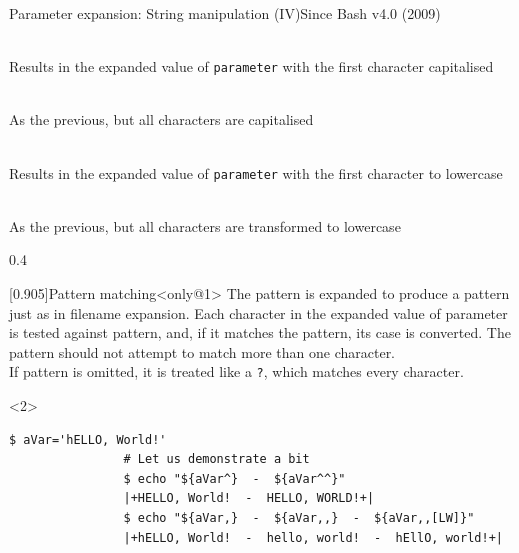 \begin{frame}[fragile]{Parameter expansion: String manipulation (IV)}{Since Bash v4.0 (2009)}
    \begin{description}
        \item[First uppercase:] \\
            {\small
                Results in the expanded value of \texttt{parameter} with the first character capitalised
            }
        \item[All uppercase:] \\
            {\small
                As the previous, but all characters are capitalised
            }
        \item[First lowercase:] \\
            {\small
                Results in the expanded value of \texttt{parameter} with the first character to lowercase
            }
        \item[All lowercase:] \\
            {\small
                As the previous, but all characters are transformed to lowercase
            }
    \end{description}
    \begin{overlayarea}{\textwidth}{0.4\textheight}
        \begin{varblock}{}[0.905\textwidth]{Pattern matching}<only@1>
            \small
            The pattern is expanded to produce a pattern just as in filename expansion.
            Each character in the expanded value of parameter is tested against pattern, and, if it matches the pattern, its case is converted.
            \alert{The pattern should not attempt to match more than one character.}\\
            If pattern is omitted, it is treated like a \texttt{?}, which matches every character.
        \end{varblock}
        \begin{onlyenv}<2>
            \begin{lstlisting}[style=MyBash, style=oddnumbers, aboveskip=5mm]
                $ aVar='hELLO, World!'
                # Let us demonstrate a bit
                $ echo "${aVar^}  -  ${aVar^^}"
                |+HELLO, World!  -  HELLO, WORLD!+|
                $ echo "${aVar,}  -  ${aVar,,}  -  ${aVar,,[LW]}"
                |+hELLO, World!  -  hello, world!  -  hEllO, world!+|
            \end{lstlisting}
        \end{onlyenv}
    \end{overlayarea}
\end{frame}

